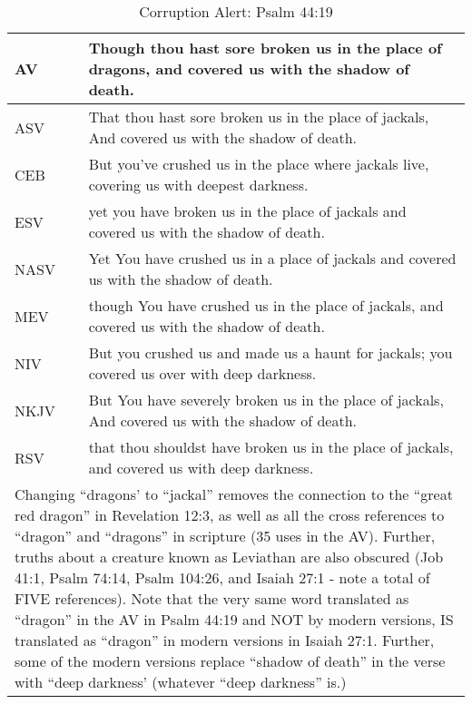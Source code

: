 \begin{center}

\begin{table}[ht]
\centering
\begin{tabular}{|p{.5in}|p{3.5in}|}
\hline

\textcolor[rgb]{0.00,0.00,1.00}{AV} & \textcolor[rgb]{0.00,0.00,1.00}{Though thou hast sore broken us in
the place of \textcolor[cmyk]{0, 0.85. 0.70. 0.23}{dragons}, and covered us with the \textcolor[cmyk]{0, 0.85. 0.70. 0.23}{shadow of death}.} \\ \hline 

\hline
\hline


ASV &  That thou hast sore broken us in the place of jackals, And covered us with the shadow of death.\\ \hline
CEB &  But you’ve crushed us in the place where jackals live,   covering us with deepest darkness.\\ \hline
ESV & yet you have broken us in the place of jackals   and covered us with the shadow of death.\\ \hline
NASV &  Yet You have crushed us in a place of jackals and covered us with the shadow of death. \\ \hline
MEV & though You have crushed us in the place of jackals,   and covered us with the shadow of death.\\ \hline
NIV &  But you crushed us and made us a haunt for jackals;  you covered us over with deep darkness. \\ \hline
NKJV &  But You have severely broken us in the place of jackals, And covered us with the shadow of death.\\ \hline
RSV &  that thou shouldst have broken us in the place of jackals,  and covered us with deep darkness.\\ \hline 

\hline
\hline

\multicolumn{2}{|p{4.3in}|}{{\textcolor{jungle}{Changing ``dragons' to ``jackal'' removes the connection to the ``great red dragon'' in Revelation 12:3, as well as all the cross references to ``dragon'' and ``dragons'' in scripture (35 uses in the AV). Further, truths about a creature known as Leviathan are also obscured (Job 41:1, Psalm 74:14, Psalm 104:26, and Isaiah 27:1 - note a total of FIVE references). Note that the very same word translated as ``dragon'' in the AV in Psalm 44:19 and NOT by modern versions, IS translated as ``dragon'' in modern versions in Isaiah 27:1.  Further, some of the modern versions replace ``shadow of death'' in the verse with ``deep darkness' (whatever ``deep darkness'' is.)}}} \\ \hline

\end{tabular}
\caption[Corruption Alert: Psalm 44:19]{Corruption Alert: Psalm 44:19} \label{table:Corruption Psalm 44:19}

\end{table}

\end{center}

